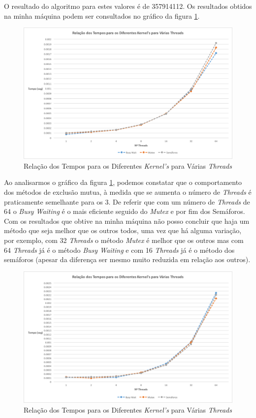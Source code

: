 \documentclass[conference,compsoc]{IEEEtran}
\begin{document}
O resultado do algoritmo para estes valores é de 357914112. Os resultados obtidos na minha máquina podem ser consultados no gráfico da figura \ref {fig:tempo_varios_kernels_my_laptop}.

\begin{figure}[h!]
\centering
\includegraphics[scale=0.325]{tempos_varios_kernels_my_laptop.png}
\caption{Relação dos Tempos para os Diferentes \textit{Kernel's} para Várias \textit{Threads}}
\label{fig:tempo_varios_kernels_my_laptop}
\end{figure}

Ao analisarmos o gráfico da figura \ref{fig:tempo_varios_kernels_my_laptop}, podemos constatar que o comportamento dos métodos de exclusão mutua, à medida que se aumenta o número de \textit{Threads} é praticamente semelhante para os 3. De referir que com um número de \textit{Threads} de 64 o \textit{Busy Waiting} é o mais eficiente seguido do \textit{Mutex} e por fim dos Semáforos. Com os resultados que obtive na minha máquina não posso concluir que haja um método que seja melhor que os outros todos, uma vez que há alguma variação, por exemplo, com 32 \textit{Threads} o método \textit{Mutex} é melhor que os outros mas com 64 \textit{Threads} já é o método \textit{Busy Waiting} e com 16 \textit{Threads} já é o método dos semáforos (apesar da diferença ser mesmo muito reduzida em relação aos outros).

\begin{figure}[h!]
\centering
\includegraphics[scale=0.325]{tempos_varios_kernels_search.png}
\caption{Relação dos Tempos para os Diferentes \textit{Kernel's} para Várias \textit{Threads}}
\label{fig:tempo_varios_kernels_search}
\end{figure}
\end{document}
